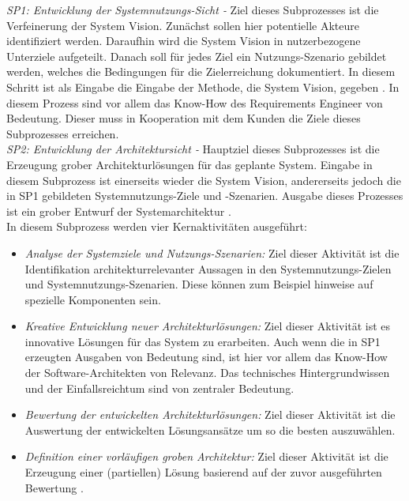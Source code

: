 \emph{SP1: Entwicklung der Systemnutzungs-Sicht -}
Ziel dieses Subprozesses ist die Verfeinerung der System Vision. Zun\"achst sollen hier potentielle Akteure identifiziert werden. Daraufhin wird die System Vision in nutzerbezogene Unterziele aufgeteilt. Danach soll f\"ur jedes Ziel ein Nutzungs-Szenario gebildet werden, welches die Bedingungen f\"ur die Zielerreichung dokumentiert. In diesem Schritt ist als Eingabe die Eingabe der Methode, die System Vision, gegeben \cite{Poh01}. In diesem Prozess sind vor allem das Know-How des Requirements Engineer von Bedeutung. Dieser muss in Kooperation mit dem Kunden die Ziele dieses Subprozesses erreichen.\\

\emph{SP2: Entwicklung der Architektursicht -}
Hauptziel dieses Subprozesses ist die Erzeugung grober Architekturl\"osungen f\"ur das geplante System. Eingabe in diesem Subprozess ist einerseits wieder die System Vision, andererseits jedoch die in SP1 gebildeten Systemnutzungs-Ziele und -Szenarien. Ausgabe dieses Prozesses ist ein grober Entwurf der Systemarchitektur \cite{Poh01}.\\

In diesem Subprozess werden vier Kernaktivit\"aten ausgef\"uhrt:\\

\begin{itemize}
\item \textit{Analyse der Systemziele und Nutzungs-Szenarien:} Ziel dieser Aktivit\"at ist die Identifikation architekturrelevanter Aussagen in den Systemnutzungs-Zielen und Systemnutzungs-Szenarien. Diese k\"onnen zum Beispiel hinweise auf spezielle Komponenten sein. 
\item \emph{Kreative Entwicklung neuer Architekturl\"osungen:} Ziel dieser Aktivit\"at ist es innovative L\"osungen f\"ur das System zu erarbeiten. Auch wenn die in SP1 erzeugten Ausgaben von Bedeutung sind, ist hier vor allem das Know-How der Software-Architekten von Relevanz. Das technisches Hintergrundwissen und der Einfallsreichtum sind von zentraler Bedeutung.
\item \emph{Bewertung der entwickelten Architekturl\"osungen:} Ziel dieser Aktivit\"at ist die Auswertung der entwickelten L\"osungsans\"atze um so die besten auszuw\"ahlen. 
\item \emph{Definition einer vorl\"aufigen groben Architektur:} Ziel dieser Aktivit\"at ist die Erzeugung einer (partiellen) L\"osung basierend auf der zuvor ausgef\"uhrten Bewertung \cite{Poh01}.\\
\end{itemize} 

